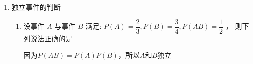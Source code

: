 \begin{enumerate}
\begin{enumerate}
        \item 已知事件 $A\text{ 、 }B\text{ 、 }C$ 两两互斥,若 $P\left( A\right)  = \dfrac{1}{6},P\left( C\right)  = \dfrac{1}{3},P(A \cup  B) = \dfrac{11}{30}$ ,则 $P\left( {B \cup  C}\right)  =$
        \begin{jieda}
            因为$A\text{ 、 }B\text{ 、 }C$ 两两互斥，所以$P(A \cup B) = P(A) + P(B)$，因此$P(B) = \dfrac{1}{5}$

            故$P(B \cup C) = P(B) + P(C) = \dfrac{8}{15}$
        \end{jieda}
    
        \item 设 $A,B$ 是一个随机试验中的两个事件,且 $P\left( A\right)  = \dfrac{1}{2},P\left( \bar{B}\right)  = \dfrac{7}{12}$ , $P\left( {\bar{A}B \cup A\bar{B}}\right)  = \dfrac{1}{4}$ 则 $P\left( {A \cup B}\right)  =$
        \begin{jieda}
            $P\left( A\right)  = \dfrac{1}{2},P\left( \bar{B}\right)  = \dfrac{7}{12}$ ,故 $P\left( \bar{A}\right)  = \dfrac{1}{2},P\left( B\right)  = \dfrac{5}{12}$
        
            因为 $\bar{A}B$ 与 $A\bar{B}$ 为互斥事件,故 $P\left( {\bar{A}B \cup  A\bar{B}}\right)  = P\left( {\bar{A}B}\right)  + P\left( {A\bar{B}}\right)  = \dfrac{1}{4}$

            又因为$\left\{ \begin{array}{l}
                 P\left( {\bar{A}B}\right)  + P\left( {AB}\right)  = P\left( B\right)  \\
                 P\left( {A\bar{B}}\right)  + P\left( {AB}\right)  = P\left( A\right) 
            \end{array} \right.$，所以有 $P\left( B\right)  - P\left( {AB}\right)  + P\left( A\right)  - P\left( {AB}\right)  = \dfrac{5}{12} + \dfrac{1}{2} - {2P}\left( {AB}\right)  = \dfrac{1}{4}$，故 $P\left( {AB}\right)  = \dfrac{1}{3}$

            故 $P\left( {A \cup B}\right)  = P\left( A\right)  + P\left( B\right)  - P\left( {AB}\right)  = \dfrac{1}{2} + \dfrac{5}{12} - \dfrac{1}{3} = \dfrac{7}{12}$.
        \end{jieda}
    \end{enumerate}
    
    \item 独立事件的判断
    \begin{enumerate}
        \item 设事件 $A$ 与事件 $B$ 满足: $P\left( A\right)  = \dfrac{2}{3},P\left( B\right)  = \dfrac{3}{4},P\left( {AB}\right)  = \dfrac{1}{2}$ ， 则下列说法正确的是
        \begin{jieda}
            因为$P(AB) = P(A)P(B)$，所以$A$和$B$独立
        \end{jieda}


\end{enumerate}
\end{enumerate}
